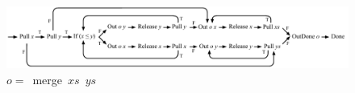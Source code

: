 \begin{figure}
%
%
%
%
%
%
%
%
%
%
%
%
%
%
%

\centering
\includegraphics{machine/merge}
\caption{$o =$~merge~$xs$~$ys$}
\label{fig:com:merge}
\end{figure}


